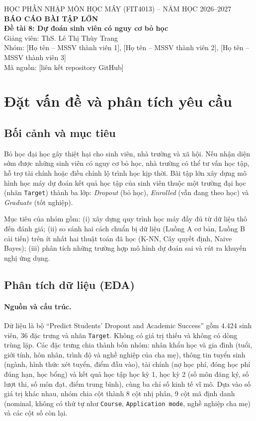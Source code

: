 \documentclass[12pt,a4paper]{article}
\begin{document}
\begin{center}
{\large HỌC PHẦN NHẬP MÔN HỌC MÁY (FIT4013) -- NĂM HỌC 2026--2027}\\[6pt]
{\LARGE\bfseries BÁO CÁO BÀI TẬP LỚN}\\[8pt]
{\Large\bfseries Đề tài 8: Dự đoán sinh viên có nguy cơ bỏ học}\\[10pt]
Giảng viên: ThS. Lê Thị Thùy Trang\\[4pt]
Nhóm: [Họ tên -- MSSV thành viên 1], [Họ tên -- MSSV thành viên 2], [Họ tên -- MSSV thành viên 3]\\
Mã nguồn: [liên kết repository GitHub]
\end{center}

\tableofcontents
\newpage

\section{Đặt vấn đề và phân tích yêu cầu}
\subsection{Bối cảnh và mục tiêu}
Bỏ học đại học gây thiệt hại cho sinh viên, nhà trường và xã hội. Nếu nhận diện sớm được những sinh viên có nguy cơ bỏ học,
nhà trường có thể tư vấn học tập, hỗ trợ tài chính hoặc điều chỉnh lộ trình học kịp thời. Bài tập lớn xây dựng mô hình học máy
dự đoán kết quả học tập của sinh viên thuộc một trường đại học (nhãn \texttt{Target}) thành ba lớp: \textit{Dropout} (bỏ học),
\textit{Enrolled} (vẫn đang theo học) và \textit{Graduate} (tốt nghiệp).

Mục tiêu của nhóm gồm: (i) xây dựng quy trình học máy đầy đủ từ dữ liệu thô đến đánh giá; (ii) so sánh hai cách chuẩn bị dữ liệu
(Luồng A cơ bản, Luồng B cải tiến) trên ít nhất hai thuật toán đã học (K-NN, Cây quyết định, Naive Bayes); (iii) phân tích những
trường hợp mô hình dự đoán sai và rút ra khuyến nghị ứng dụng.

\subsection{Phân tích dữ liệu (EDA)}
\paragraph{Nguồn và cấu trúc.}
Dữ liệu là bộ ``Predict Students' Dropout and Academic Success'' \cite{realinho2022} gồm 4.424 sinh viên, 36 đặc trưng và nhãn
\texttt{Target}. Không có giá trị thiếu và không có dòng trùng lặp. Các đặc trưng chia thành bốn nhóm: nhân khẩu học và gia đình
(tuổi, giới tính, hôn nhân, trình độ và nghề nghiệp của cha mẹ), thông tin tuyển sinh (ngành, hình thức xét tuyển, điểm đầu vào),
tài chính (nợ học phí, đóng học phí đúng hạn, học bổng) và kết quả học tập học kỳ 1, học kỳ 2 (số môn đăng ký, số lượt thi,
số môn đạt, điểm trung bình), cùng ba chỉ số kinh tế vĩ mô. Dựa vào số giá trị khác nhau, nhóm chia cột thành 8 cột nhị phân,
9 cột mã định danh (nominal, không có thứ tự như \texttt{Course}, \texttt{Application mode}, nghề nghiệp cha mẹ) và các cột số còn lại.
\end{document}
